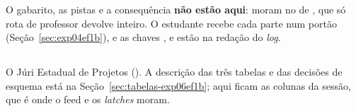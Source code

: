 \begin{regra}
O gabarito, as pistas e a consequência \textbf{não estão aqui}: moram no
 de , que só rota de professor devolve inteiro.
O estudante recebe cada parte num portão (Seção~\ref{sec:exp04ef1b}), e as chaves
,  e  estão na redação do
\emph{log}.
\end{regra}

\subsection{}

O Júri Estadual de Projetos (). A descrição das três tabelas e
das decisões de esquema está na Seção~\ref{sec:tabelas-exp06ef1b}; aqui ficam
as colunas da sessão, que é onde o feed e os \emph{latches} moram.

